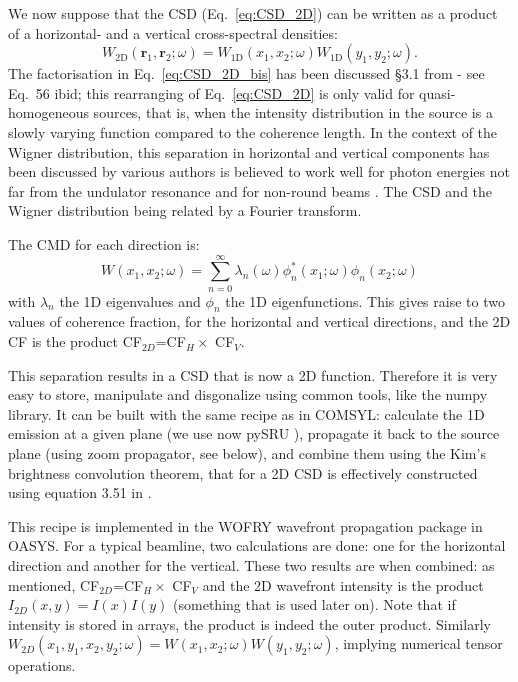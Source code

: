 \documentclass{iucr}              %
\begin{document}
We now suppose that the CSD (Eq.~\ref{eq:CSD_2D}) can be written as a product of a horizontal- and a vertical cross-spectral densities: 
\begin{equation}
W_\text{2D}(\textbf{r}_1,\textbf{r}_2;\omega) = W_\text{1D}(x_1,x_2;\omega)W_\text{1D}(y_1,y_2;\omega).
\label{eq:CSD_2D_bis}
\end{equation}
The factorisation in Eq.~\ref{eq:CSD_2D_bis} has been discussed §3.1 from \cite{geloni2008} - see Eq.~56 ibid; this rearranging of Eq.~\ref{eq:CSD_2D} is only valid for quasi-homogeneous sources, that is, when the intensity distribution in the source is a slowly varying function compared to the coherence length. In the context of the Wigner distribution, this separation in horizontal and vertical components has been discussed by various authors is believed to work well for photon energies not far from the undulator resonance and for non-round beams \cite{tanaka2014,nash2021}. The CSD and the Wigner distribution being related by a Fourier transform. 

 The CMD for each direction is:
\begin{equation}
W(x_1,x_2;\omega) = \sum_{n=0}^{\infty} \lambda_n(\omega) \phi_n^*(x_1;\omega) \phi_n(x_2;\omega) 
\label{eq:CMD1D}
\end{equation}
with $\lambda_n$ the 1D eigenvalues and $\phi_n$ the 1D eigenfunctions. This gives raise to two values of coherence fraction, for the horizontal and vertical directions, and the 2D CF is the product CF$_{2D}$=CF$_H \times$ CF$_V$.

This separation results in a CSD that is now a 2D function. Therefore it is very easy to store, manipulate and disgonalize using common tools, like the numpy library. It can be built with the same recipe as in COMSYL: calculate the 1D emission at a given plane (we use now pySRU \cite{codePSU}), propagate it back to the source plane (using zoom propagator, see below), and combine them using the Kim's brightness convolution theorem, that for a 2D CSD is effectively constructed using equation 3.51 in \cite{glass2017}.

This recipe is implemented in the WOFRY wavefront propagation package in OASYS. For a typical beamline, two calculations are done: one for the horizontal direction and another for the vertical. These two results are when combined: as mentioned, CF$_{2D}$=CF$_H \times$ CF$_V$ and the 2D wavefront intensity is the product $I_{2D}(x,y)=I(x) I(y)$ (something that is used later on). Note that if intensity is stored in arrays, the product is indeed the outer product.  Similarly $W_{2D}(x_1,y_1,x_2,y_2; \omega)=W(x_1,x_2;\omega) W(y_1,y_2;\omega)$, implying numerical tensor operations.  
\end{document}
